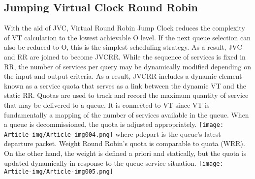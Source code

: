 \subsection{Jumping Virtual Clock Round Robin }
With the aid of JVC, Virtual Round Robin Jump Clock reduces the complexity of VT calculation to the lowest achievable O level. If the next queue selection can also be reduced to O, this is the simplest scheduling strategy. As a result, JVC and RR are joined to become JVCRR. While the sequence of services is fixed in RR, the number of services per query may be dynamically modified depending on the input and output criteria. As a result, JVCRR includes a dynamic element known as a service quota that serves as a link between the dynamic VT and the static RR. Quotas are used to track and record the maximum quantity of service that may be delivered to a queue. It is connected to VT since VT is fundamentally a mapping of the number of services available in the queue. When a queue is decommissioned, the quota is adjusted appropriately.
 \texttt{[image: Article-img/Article-img004.png]} 
where pdepart is the queue's latest departure packet. Weight Round Robin's quota is comparable to quota (WRR). On the other hand, the weight is defined a priori and statically, but the quota is updated dynamically in response to the queue service situation.
 \texttt{[image: Article-img/Article-img005.png]} 
